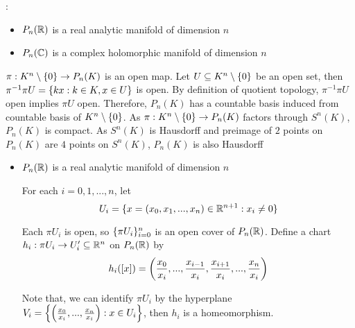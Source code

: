 \begin{proposition}:
	\begin{itemize}
		\item $P_n(\R)$ is a real analytic manifold of dimension $n$
		\item $P_n(\C)$ is a complex holomorphic manifold of dimension $n$
	\end{itemize}
	\begin{longproof}
		
		$\pi: K^n \setminus \set{0} \to P_n(K)$ is an open map. Let $U \subseteq K^n \setminus \set{0}$ be an open set, then $\pi^{-1} \pi U = \set{kx: k \in K, x \in U}$ is open. By definition of quotient topology, $\pi^{-1} \pi U$ open implies $\pi U$ open. Therefore, $P_n(K)$ has a countable basis induced from countable basis of $K^n \setminus \set{0}$. As $\pi: K^n \setminus \set{0} \to P_n(K)$ factors through $S^n(K)$, $P_n(K)$ is compact. As $S^n(K)$ is Hausdorff and preimage of $2$ points on $P_n(K)$ are $4$ points on $S^n(K)$, $P_n(K)$ is also Hausdorff
		
		\begin{itemize} 
			\item $P_n(\R)$ is a real analytic manifold of dimension $n$
			
			For each $i=0, 1, ..., n$, let
			$$
			U_i = \set{x = (x_0, x_1, ..., x_n) \in \R^{n+1}: x_i \neq 0}
			$$
			
			Each $\pi U_i$ is open, so $\set{\pi U_i}_{i=0}^n$ is an open cover of $P_n(\R)$. Define a chart $h_i: \pi U_i \to U_i' \subseteq \R^{n}$ on $P_n(\R)$ by 
			$$
			h_i([x]) = \tuple*{\frac{x_0}{x_i}, ..., \frac{x_{i-1}}{x_i}, \frac{x_{i+1}}{x_i}, ..., \frac{x_n}{x_i}}
			$$
			
			Note that, we can identify $\pi U_i$ by the hyperplane $V_i = \set*{\tuple*{\frac{x_0}{x_i}, ..., \frac{x_n}{x_i}}: x \in U_i}$, then $h_i$ is a homeomorphism.
			
			\begin{center}
			\end{center}
			

\end{itemize}
\end{longproof}
\end{proposition}
